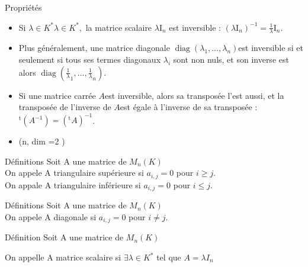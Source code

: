 \documentclass{book}
\begin{document}
\begin{Propriété}[]{Propriétés}{}
    \begin{itemize}
        \item Si ${\displaystyle \lambda \in K^{*}}{\displaystyle \lambda \in K^{*}},$ la matrice scalaire ${\displaystyle \lambda \mathrm {I} _{n}}$ est inversible : ${\displaystyle (\lambda \mathrm {I} _{n})^{-1}={\frac {1}{\lambda }}\mathrm {I} _{n}}$.
     \item Plus généralement, une matrice diagonale ${\displaystyle \operatorname {diag} \left(\lambda _{1},\dots ,\lambda _{n}\right)}$est inversible si et seulement si tous ses termes diagonaux ${\displaystyle \lambda _{i}}$ sont non nuls, et son inverse est alors ${\displaystyle \operatorname {diag} \left({\frac {1}{\lambda }}_{1},\dots ,{\frac {1}{\lambda }}_{n}\right)}$.
     \item Si une matrice carrée ${\displaystyle A} $est inversible, alors sa transposée l'est aussi, et la transposée de l'inverse de ${\displaystyle A} $est égale à l'inverse de sa transposée :
${\displaystyle ^{\operatorname {t} }\!(A^{-1})=(^{\operatorname {t} }\!A)^{-1}}$.
     \item (n, dim =2 )
    \end{itemize}
\end{Propriété}
\begin{Définition}[]{Définitions}{}
Soit A une matrice de \(M_{n}(K)\)
\\ On appele A triangulaire supérieure si
\(a_{i,j}=0\) pour \(i \ge j\).
\\ On appale A triangulaire inférieure si
\(a_{i,j}=0\) pour \(i \le j\).
\end{Définition}
\begin{Définition}[]{Définitions}{}
Soit A une matrice de \(M_{n}(K)\)
\\ On appele A diagonale si
\(a_{i,j}=0\) pour \(i \neq j\).
\end{Définition}
\begin{Définition}[]{Définition}{}
Soit A une matrice de \(M_{n}(K)\)

On appelle  A matrice scalaire si  \(\exists \lambda \in K^* \) tel que \(A= \lambda  I_{n}\)
\end{Définition}
\end{document}
